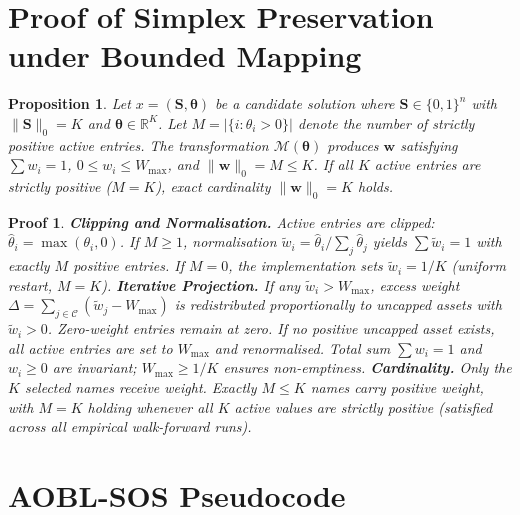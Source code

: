 \documentclass[11pt,a4paper]{article}
\newtheorem{proposition}{Proposition}
\newtheorem{proof_prop}{Proof}
\begin{document}



\clearpage

\appendix
\section{Proof of Simplex Preservation under Bounded Mapping}
\begin{proposition}
Let $x = (\mathbf{S}, \boldsymbol{\theta})$ be a candidate solution where $\mathbf{S} \in \{0,1\}^n$ with $\|\mathbf{S}\|_0 = K$ and $\boldsymbol{\theta} \in \mathbb{R}^K$. Let $M = |\{i : \theta_i > 0\}|$ denote the number of strictly positive active entries. The transformation $\mathcal{M}(\boldsymbol{\theta})$ produces $\mathbf{w}$ satisfying $\sum w_i = 1$, $0 \le w_i \le W_{\max}$, and $\|\mathbf{w}\|_0 = M \le K$. If all $K$ active entries are strictly positive ($M = K$), exact cardinality $\|\mathbf{w}\|_0 = K$ holds.
\end{proposition}

\begin{proof_prop}
\textbf{Clipping and Normalisation.} Active entries are clipped: $\hat{\theta}_i = \max(\theta_i, 0)$. If $M \ge 1$, normalisation $\tilde{w}_i = \hat{\theta}_i / \sum_j \hat{\theta}_j$ yields $\sum \tilde{w}_i = 1$ with exactly $M$ positive entries. If $M = 0$, the implementation sets $\tilde{w}_i = 1/K$ (uniform restart, $M=K$).
\textbf{Iterative Projection.} If any $\tilde{w}_i > W_{\max}$, excess weight $\Delta = \sum_{j \in \mathcal{C}} (\tilde{w}_j - W_{\max})$ is redistributed proportionally to uncapped assets with $\tilde{w}_i > 0$. Zero-weight entries remain at zero. If no positive uncapped asset exists, all active entries are set to $W_{\max}$ and renormalised. Total sum $\sum w_i = 1$ and $w_i \ge 0$ are invariant; $W_{\max} \ge 1/K$ ensures non-emptiness.
\textbf{Cardinality.} Only the $K$ selected names receive weight. Exactly $M \le K$ names carry positive weight, with $M = K$ holding whenever all $K$ active values are strictly positive (satisfied across all empirical walk-forward runs).
\end{proof_prop}

\vspace{-0.3em}
\section{AOBL-SOS Pseudocode}
\end{document}
